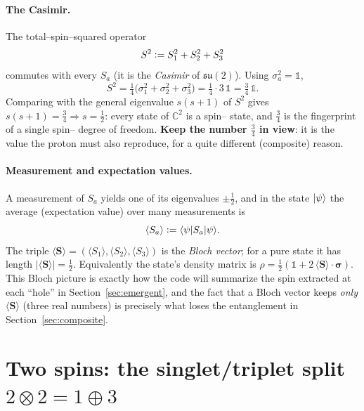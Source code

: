 \documentclass[11pt,oneside]{article}
\newcommand{\C}{\mathbb{C}}
\newcommand{\halff}{\tfrac{1}{2}}
\newcommand{\id}{\mathbb{1}}
\newcommand{\eqdef}{\vcentcolon=}
\newcommand{\expval}[1]{\langle #1 \rangle}
\newcommand{\mel}[3]{\langle #1 | #2 | #3 \rangle}
\begin{document}
\paragraph{The Casimir.}
The total--spin--squared operator
\begin{equation}
  S^2 \eqdef S_1^2 + S_2^2 + S_3^2
\end{equation}
commutes with every $S_a$ (it is the \emph{Casimir} of $\mathfrak{su}(2)$).
Using $\sigma_a^2 = \id$,
\begin{equation}
  S^2 = \tfrac14\big(\sigma_1^2+\sigma_2^2+\sigma_3^2\big)
      = \tfrac14\cdot 3\,\id = \tfrac34\,\id .
  \label{eq:onecasimir}
\end{equation}
Comparing with the general eigenvalue $s(s+1)$ of $S^2$ gives
$s(s+1)=\tfrac34 \Rightarrow s=\tfrac12$: every state of $\C^2$ is a
spin--\textonehalf{} state, and $\tfrac34$ is the fingerprint of a single
spin--\textonehalf{} degree of freedom. \textbf{Keep the number $\tfrac34$ in
view}: it is the value the proton must also reproduce, for a quite different
(composite) reason.

\paragraph{Measurement and expectation values.}
A measurement of $S_a$ yields one of its eigenvalues $\pm\tfrac12$, and in the
state $\ket\psi$ the average (expectation value) over many measurements is
\begin{equation}
  \expval{S_a} \eqdef \mel{\psi}{S_a}{\psi} .
\end{equation}
The triple $\expval{\bm S}=(\expval{S_1},\expval{S_2},\expval{S_3})$ is the
\emph{Bloch vector}; for a pure state it has length
$|\expval{\bm S}|=\tfrac12$. Equivalently the state's density matrix is
$\rho = \halff(\id + 2\,\expval{\bm S}\cdot\bm\sigma)$. This Bloch picture is
exactly how the code will summarize the spin extracted at each ``hole'' in
Section~\ref{sec:emergent}, and the fact that a Bloch vector keeps \emph{only}
$\expval{\bm S}$ (three real numbers) is precisely what loses the entanglement
in Section~\ref{sec:composite}.

\section{Two spins: the singlet/triplet split $2\otimes2 = 1\oplus3$}
\label{sec:twospin}
\end{document}
